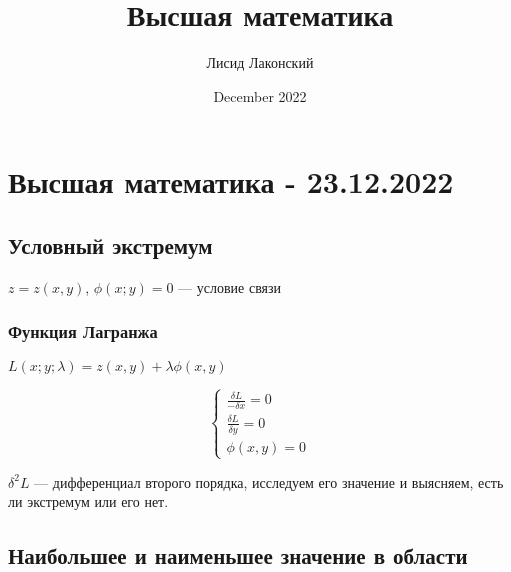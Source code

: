\documentclass{article}
\title{Высшая математика}
\author{Лисид Лаконский}
\date{December 2022}
\begin{document}
\maketitle

\tableofcontents
\pagebreak

\section{Высшая математика - 23.12.2022}

\subsection{Условный экстремум}

\begin{flushleft}

$z = z(x, y)$, $\phi (x; y) = 0$ — условие связи

\subsubsection{Функция Лагранжа}

$L(x; y; \lambda) = z(x, y) + \lambda \phi (x, y)$

\begin{equation}
    \begin{cases}
        \frac{\delta L}{-\delta x} = 0 \\
        \frac{\delta L}{\delta y} = 0 \\
        \phi (x, y) = 0
    \end{cases}
\end{equation}

$\delta^2 L$ — дифференциал второго порядка, исследуем его значение и выясняем, есть ли экстремум или его нет.

\end{flushleft}

\subsection{Наибольшее и наименьшее значение в области}
\end{document}
